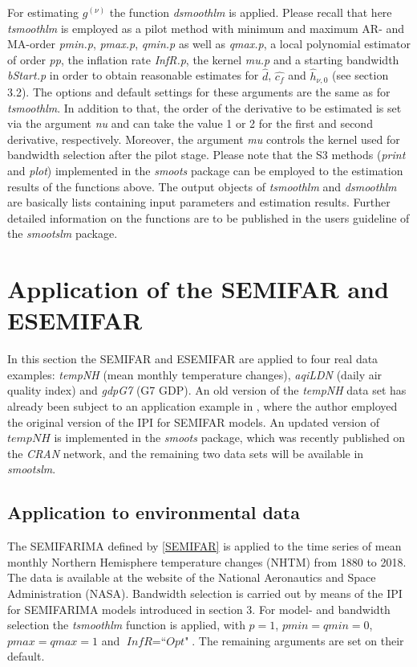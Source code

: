\documentclass[12pt]{article}
\begin{document}
For estimating $g^{(\nu)}$ the function \textit{dsmoothlm} is applied. Please recall that here \textit{tsmoothlm} is employed as a pilot method with minimum and maximum AR- and MA-order \textit{pmin.p}, \textit{pmax.p}, \textit{qmin.p} as well as \textit{qmax.p}, a local polynomial estimator of order \textit{pp}, the inflation rate \textit{InfR.p}, the kernel \textit{mu.p} and a starting bandwidth \textit{bStart.p} in order to obtain reasonable estimates for $\hat{d}$, $\hat{c_f}$ and $\hat{h}_{\nu,0}$ (see section 3.2). The options and default settings for these arguments are the same as for \textit{tsmoothlm}. In addition to that, the order of the derivative to be estimated is set via the argument \textit{nu} and can take the value 1 or 2 for the first and second derivative, respectively. Moreover, the argument \textit{mu} controls the kernel used for bandwidth selection after the pilot stage. Please note that the S3 methods (\textit{print} and \textit{plot}) implemented in the \textit{smoots} package can be employed to the estimation results of the functions above. The output objects of \textit{tsmoothlm} and \textit{dsmoothlm} are basically lists containing input parameters and estimation results. Further detailed information on the functions are to be published in the users guideline of the \textit{smootslm} package.       


\section{Application of the SEMIFAR and ESEMIFAR}
In this section the SEMIFAR and ESEMIFAR are applied to four real data examples: \textit{tempNH} (mean monthly temperature changes), \textit{aqiLDN} (daily air quality index) and \textit{gdpG7} (G7 GDP). An old version of the \textit{tempNH} data set has already been subject to an application example in \citet{feng2007asymptotic}, where the author employed the original version of the IPI for SEMIFAR models. An updated version of $\textit{tempNH}$ is implemented in the \textit{smoots} package, which was recently published on the \textit{CRAN} network, and the remaining two data sets will be available in \textit{smootslm}. 

\subsection{Application to environmental data}
The SEMIFARIMA defined by \eqref{SEMIFAR} is applied to the time series of mean monthly Northern Hemisphere temperature changes (NHTM) from 1880 to 2018. The data is available at the website of the National Aeronautics and Space Administration (NASA). Bandwidth selection is carried out by means of the IPI for SEMIFARIMA models introduced in section 3. For model- and bandwidth selection the \textit{tsmoothlm} function is applied, with $\textit{p} = 1$, $\textit{pmin} = \textit{qmin} = 0$, $\textit{pmax} = \textit{qmax} = 1$ and $\textit{InfR} = \textit{``Opt"}$. The remaining arguments are set on their default. 
\end{document}
